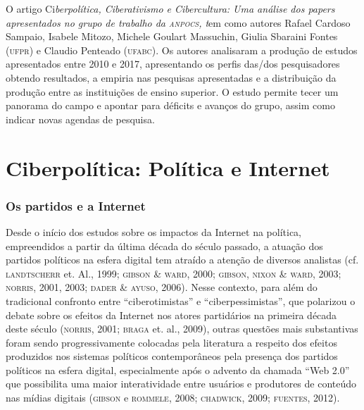 O artigo Ci\emph{berpolítica, Ciberativismo e Cibercultura: Uma análise
dos papers apresentados no grupo de trabalho da \textsc{anpocs}, t}em como
autores Rafael Cardoso Sampaio, Isabele Mitozo, Michele Goulart
Massuchin, Giulia Sbaraini Fontes (\textsc{ufpr}) e Claudio Penteado (\textsc{ufabc}). Os
autores analisaram a produção de estudos apresentados entre 2010 e 2017,
apresentando os perfis das/dos pesquisadores obtendo resultados, a
empiria nas pesquisas apresentadas e a distribuição da produção entre as
instituições de ensino superior. O estudo permite tecer um panorama do
campo e apontar para déficits e avanços do grupo, assim como indicar
novas agendas de pesquisa.




\part{Ciberpolítica: Política e Internet}




\section{Os partidos e a Internet}

\noindent{}Desde o início dos estudos sobre os impactos da Internet na política,
empreendidos a partir da última década do século passado, a atuação dos
partidos políticos na esfera digital tem atraído a atenção de diversos
analistas (cf. \textsc{landtscherr} et. Al., 1999; \textsc{gibson} \& \textsc{ward}, 2000; \textsc{gibson},
\textsc{nixon} \& \textsc{ward}, 2003; \textsc{norris}, 2001, 2003; \textsc{dader} \& \textsc{ayuso}, 2006). Nesse
contexto, para além do tradicional confronto entre ``ciberotimistas'' e
``ciberpessimistas'', que polarizou o debate sobre os efeitos da
Internet nos atores partidários na primeira década deste século (\textsc{norris},
2001; \textsc{braga} et. al., 2009), outras questões mais substantivas foram
sendo progressivamente colocadas pela literatura a respeito dos efeitos
produzidos nos sistemas políticos contemporâneos pela presença dos
partidos políticos na esfera digital, especialmente após o advento da
chamada ``Web 2.0'' que possibilita uma maior interatividade entre
usuários e produtores de conteúdo nas mídias digitais (\textsc{gibson} e \textsc{rommele},
2008; \textsc{chadwick}, 2009; \textsc{fuentes}, 2012).

